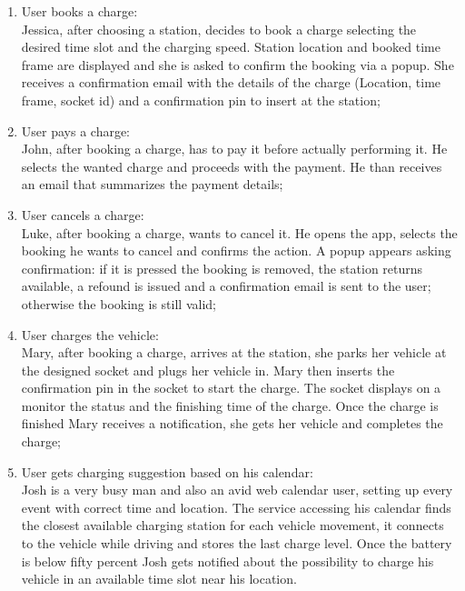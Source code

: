 \begin{enumerate}[label=\textbf{S\arabic*}]
    \item User books a charge:\\
          Jessica, after choosing a station, decides to book a charge selecting the desired time slot and the charging speed. Station location and booked time frame are displayed and she is asked to confirm the booking via a popup. She receives a confirmation email with the details
          of the charge (Location, time frame, socket id) and a confirmation pin to insert at the station;\label{SCE:user-books-charge}
    \item User pays a charge:\\
          John, after booking a charge, has to pay it before actually performing it. He selects the wanted charge and proceeds with the payment. He than receives an email that summarizes the payment details;\label{SCE:user-pays-charge}
    \item User cancels a charge:\\
          Luke, after booking a charge, wants to cancel it. He opens the app, selects the booking he wants to cancel and confirms the action. A popup appears asking confirmation: if it is pressed the booking is removed, the station returns available, a refound is issued and a confirmation email is sent to the user; otherwise the booking is still valid;\label{SCE:user-cancels-charge}
    \item User charges the vehicle:\\
          Mary, after booking a charge, arrives at the station, she parks her vehicle at the designed socket
          and plugs her vehicle in. Mary then inserts the confirmation pin in the socket to start the charge.
          The socket displays on a monitor the status and the finishing time of the charge.
          Once the charge is finished Mary receives a notification,
          she gets her vehicle and completes the charge;\label{SCE:user-charges-vehicle}
    \item User gets charging suggestion based on his calendar:\\
          Josh is a very busy man and also an avid web calendar user,
          setting up every event with correct time and location.
          The service accessing his calendar finds the closest available charging station for each vehicle movement,
          it connects to the vehicle while driving and stores the last charge level. Once the battery is below fifty percent Josh gets notified
          about the possibility to charge his vehicle in an available time slot near his location.

\end{enumerate}
